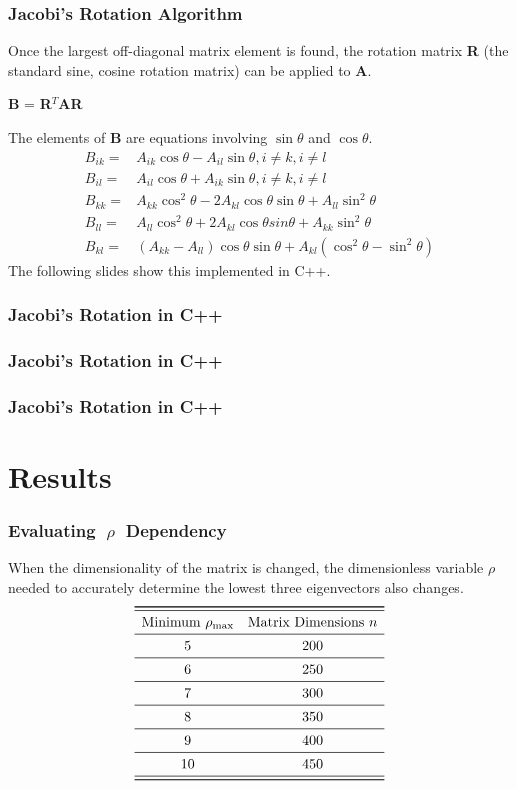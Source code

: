 \documentclass[10pt,xcolor={x11names}]{beamer}
\begin{document}
		\begin{frame} \frametitle{Jacobi's Rotation Algorithm}
			Once the largest off-diagonal matrix element is found, the rotation matrix \textbf{R}  (the standard sine, cosine rotation matrix) can be applied to \textbf{A}.
			\centerline{\textbf{B} = \textbf{R}$^T$\textbf{AR}}
			The elements of \textbf{B} are equations involving $\sin \theta$ and $\cos \theta$.
			\begin{align*}
  			B_{ik} =& A_{ik}\cos\theta - A_{il}\sin\theta , i \ne k, i \ne l \\
  			B_{il} =& A_{il}\cos\theta + A_{ik}\sin\theta , i \ne k, i \ne l \\
  			B_{kk} =& A_{kk}\cos^2\theta - 2A_{kl}\cos\theta \sin\theta +A_{ll}\sin^2\theta\\
  			B_{ll} =& A_{ll}\cos^2\theta +2A_{kl}\cos\theta sin\theta +A_{kk}\sin^2\theta\\
  			B_{kl} =& (A_{kk}-A_{ll})\cos\theta \sin\theta +A_{kl}(\cos^2\theta-\sin^2\theta)
			\end{align*}
			The following slides show this implemented in C++.
		\end{frame}

		\begin{frame} \frametitle{Jacobi's Rotation in C++}
			
		\end{frame}

		\begin{frame} \frametitle{Jacobi's Rotation in C++}
			
		\end{frame}

		\begin{frame} \frametitle{Jacobi's Rotation in C++}
			
		\end{frame}

	\section{Results}
		\begin{frame} \frametitle{Evaluating $\; \rho \;$ Dependency}
			When the dimensionality of the matrix is changed, the  dimensionless variable $\rho$ needed to accurately determine the lowest three eigenvectors also changes.
    		\[
    		\begin{array}{cc}
    		\toprule \midrule
     		\text{Minimum } \rho_\text{max} & \text{Matrix Dimensions } n  \\ \midrule
    		5 & 200 \\ \midrule
    		6 & 250 \\ \midrule
    		7 & 300 \\ \midrule
    		8 & 350 \\ \midrule
    		9 & 400 \\ \midrule
    		10 & 450 \\ \midrule
    		\bottomrule
    		\end{array}
    		\]
		\end{frame}
\end{document}
